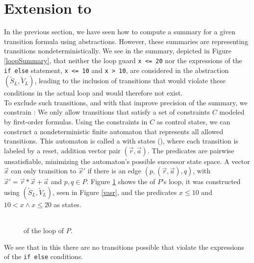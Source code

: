 \section{Extension to \qvasrs}
\begin{comment}
\jw{Introduction qvasrs $\rightarrow$ summary precision improvement \\
- What are qvasr? How to compute their reachability relation $\rightarrow$ Parikh image? \\ 
How do they improve precision? \\
- running example to qvasrs \\
\vspace{1cm}
15 pages}
\end{comment}
In the previous section, we have seen how to compute a summary for a given transition formula using \qvasr abstractions. However, these summaries are representing transitions nondeterministically.
We see in the summary, depicted in Figure \ref{loopSummary}, that neither the loop guard \texttt{x <= 20} nor the expressions of the \texttt{if else} statement, \texttt{x <= 10} and \texttt{x > 10}, are considered in the \qvasr abstraction $(\tilde{S}_L, \tilde{V}_L)$, leading to the inclusion of transitions that would violate these conditions in the actual loop and would therefore not exist. \\
To exclude such transitions, and with that improve precision of the summary, we constrain \qvasr: We only allow transitions that satisfy a set of constraints $C$ modeled by first-order formulas. Using the constraints in $C$ as control states, we can construct a nondeterministic finite automaton that represents all allowed transitions. This automaton is called a \qvasr with states (\qvasrs), where each transition is labeled by a reset, addition vector pair $(\vec{r}, \vec{a})$. The predicates are pairwise unsatisfiable, minimizing the automaton's possible successor state space. A vector $\vec{x}$ can only transition to $\vec{x}'$ if there is an edge $(p, (\vec{r}, \vec{a}), q)$, with $\vec{x}' = \vec{r} * \vec{x} + \vec{a}$ and $p, q \in P$.
Figure \ref{qvasrs_ex} shows the \qvasrs of $P$'s loop, it was constructed using $(\tilde{S}_L, \tilde{V}_L)$, seen in Figure \ref{vasr}, and the predicates $x \leq 10$ and $10 < x \land x \leq 20$ as states.
\begin{figure}[H]
	
	\caption{\\ \qvasrs of the loop of $P$.}
	\label{qvasrs_ex}
\end{figure}
We see that in this \qvasrs there are no transitions possible that violate the expressions of the \texttt{if else} conditions. \par
\label{qvasrs}